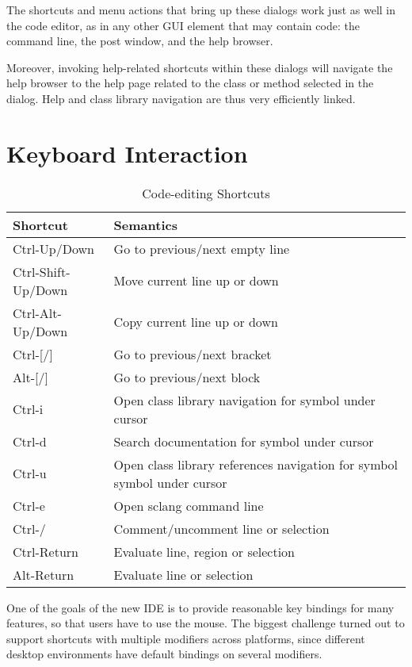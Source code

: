 \documentclass[11pt,a4paper]{article}
\begin{document}
The shortcuts and menu actions that bring up these dialogs work just as well in the code editor,
as in any other GUI element that may contain code: the command line, the post window, and the help
browser.

Moreover, invoking help-related shortcuts within these dialogs will navigate the help browser to the
help page related to the class or method selected in the dialog. Help and class library navigation
are thus very efficiently linked.

\section{Keyboard Interaction}

\begin{table*}[t]
\begin{tabular}{  l  l  }
  \toprule
  Shortcut & Semantics \\
  \midrule
  Ctrl-Up/Down & Go to previous/next empty line \\
  Ctrl-Shift-Up/Down & Move current line up or down \\
  Ctrl-Alt-Up/Down & Copy current line up or down \\
  Ctrl-[/] & Go to previous/next bracket \\
  Alt-[/] & Go to previous/next block \\

  Ctrl-i & Open class library navigation for symbol under cursor \\
  Ctrl-d & Search documentation for symbol under cursor \\
  Ctrl-u & Open class library references navigation for symbol symbol under cursor \\
  Ctrl-e & Open sclang command line \\

  Ctrl-/ & Comment/uncomment line or selection \\
  Ctrl-Return & Evaluate line, region or selection \\
  Alt-Return & Evaluate line or selection \\

  \bottomrule
\end{tabular}
\caption{Code-editing Shortcuts}
\label{tab:code_shortcuts}
\end{table*}

One of the goals of the new IDE is to provide reasonable key bindings for many features, so that users have to use the
mouse. The biggest challenge turned out to support shortcuts with multiple modifiers across platforms, since different
desktop environments have default bindings on several modifiers.
\end{document}
